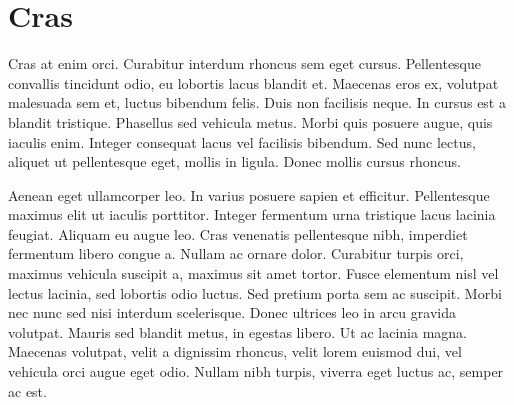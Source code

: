\chapter{Cras}

Cras at enim orci. Curabitur interdum rhoncus sem eget cursus. Pellentesque convallis tincidunt odio, eu lobortis lacus blandit et. Maecenas eros ex, volutpat malesuada sem et, luctus bibendum felis. Duis non facilisis neque. In cursus est a blandit tristique. Phasellus sed vehicula metus. Morbi quis posuere augue, quis iaculis enim. Integer consequat lacus vel facilisis bibendum. Sed nunc lectus, aliquet ut pellentesque eget, mollis in ligula. Donec mollis cursus rhoncus.

Aenean eget ullamcorper leo. In varius posuere sapien et efficitur. Pellentesque maximus elit ut iaculis porttitor. Integer fermentum urna tristique lacus lacinia feugiat. Aliquam eu augue leo. Cras venenatis pellentesque nibh, imperdiet fermentum libero congue a. Nullam ac ornare dolor. Curabitur turpis orci, maximus vehicula suscipit a, maximus sit amet tortor. Fusce elementum nisl vel lectus lacinia, sed lobortis odio luctus. Sed pretium porta sem ac suscipit. Morbi nec nunc sed nisi interdum scelerisque. Donec ultrices leo in arcu gravida volutpat. Mauris sed blandit metus, in egestas libero. Ut ac lacinia magna. Maecenas volutpat, velit a dignissim rhoncus, velit lorem euismod dui, vel vehicula orci augue eget odio. Nullam nibh turpis, viverra eget luctus ac, semper ac est.
